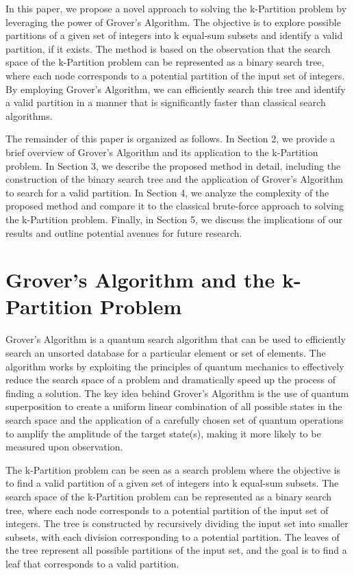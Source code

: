 In this paper, we propose a novel approach to solving the k-Partition problem by leveraging the power of Grover's Algorithm. The objective is to explore possible partitions of a given set of integers into k equal-sum subsets and identify a valid partition, if it exists. The method is based on the observation that the search space of the k-Partition problem can be represented as a binary search tree, where each node corresponds to a potential partition of the input set of integers. By employing Grover's Algorithm, we can efficiently search this tree and identify a valid partition in a manner that is significantly faster than classical search algorithms.

The remainder of this paper is organized as follows. In Section 2, we provide a brief overview of Grover's Algorithm and its application to the k-Partition problem. In Section 3, we describe the proposed method in detail, including the construction of the binary search tree and the application of Grover's Algorithm to search for a valid partition. In Section 4, we analyze the complexity of the proposed method and compare it to the classical brute-force approach to solving the k-Partition problem. Finally, in Section 5, we discuss the implications of our results and outline potential avenues for future research.

\section{Grover's Algorithm and the k-Partition Problem}

Grover's Algorithm is a quantum search algorithm that can be used to efficiently search an unsorted database for a particular element or set of elements. The algorithm works by exploiting the principles of quantum mechanics to effectively reduce the search space of a problem and dramatically speed up the process of finding a solution. The key idea behind Grover's Algorithm is the use of quantum superposition to create a uniform linear combination of all possible states in the search space and the application of a carefully chosen set of quantum operations to amplify the amplitude of the target state(s), making it more likely to be measured upon observation.

The k-Partition problem can be seen as a search problem where the objective is to find a valid partition of a given set of integers into k equal-sum subsets. The search space of the k-Partition problem can be represented as a binary search tree, where each node corresponds to a potential partition of the input set of integers. The tree is constructed by recursively dividing the input set into smaller subsets, with each division corresponding to a potential partition. The leaves of the tree represent all possible partitions of the input set, and the goal is to find a leaf that corresponds to a valid partition.


